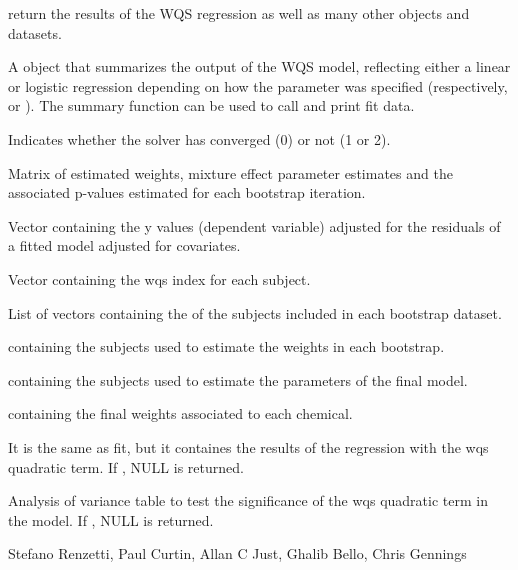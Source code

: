 \documentclass[a4paper]{book}
\begin{document}
\begin{Value}
 return the results of the WQS regression as well as many other objects and datasets.

\begin{ldescription}
\item[\code{fit}] A  object that summarizes the output of the WQS model, reflecting either a
linear or logistic regression depending on how the  parameter was specified
(respectively,  or ). The summary function can be used to call and
print fit data.
\item[\code{conv}] Indicates whether the solver has converged (0) or not (1 or 2).
\item[\code{wb1pm}] Matrix of estimated weights, mixture effect parameter estimates and the associated
p-values estimated for each bootstrap iteration.
\item[\code{y\_adj}] Vector containing the y values (dependent variable) adjusted for the residuals of a
fitted model adjusted for covariates.
\item[\code{wqs}] Vector containing the wqs index for each subject.
\item[\code{index\_b}] List of vectors containing the  of the subjects included in each
bootstrap dataset.
\item[\code{data\_t}]  containing the subjects used to estimate the weights in each
bootstrap.
\item[\code{data\_v}]  containing the subjects used to estimate the parameters of the final
model.
\item[\code{final\_weights}]  containing the final weights associated to each chemical.
\item[\code{fit\_2}] It is the same as fit, but it containes the results of the regression with the wqs
quadratic term. If , NULL is returned.
\item[\code{aov}] Analysis of variance table to test the significance of the wqs quadratic term in the
model. If , NULL is returned.
\end{ldescription}
\end{Value}
%
\begin{Author}\relax
Stefano Renzetti, Paul Curtin, Allan C Just, Ghalib Bello, Chris Gennings
\end{Author}
%
\end{document}
